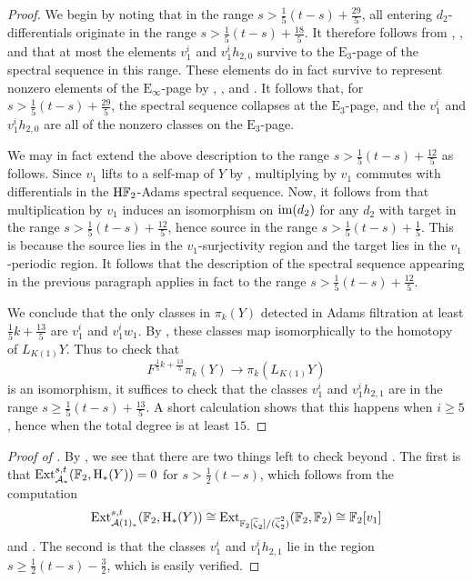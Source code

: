 \begin{proof}
    We begin by noting that in the range $s > \frac{1}{5} (t-s) + \frac{29}{5}$, all entering $d_2$-differentials originate in the range $s > \frac{1}{5} (t-s) + \frac{18}{5}$. It therefore follows from , ,  and  that at most the elements $v_1 ^i$ and $v_1 ^i h_{2,0}$ survive to the $\mathrm{E}_3$-page of the spectral sequence in this range. These elements do in fact survive to represent nonzero elements of the $\mathrm{E}_\infty$-page by , , and . It follows that, for $s > \frac{1}{5} (t-s) + \frac{29}{5}$, the spectral sequence collapses at the $\mathrm{E}_3$-page, and the $v_1 ^i$ and $v_1^i h_{2,0}$ are all of the nonzero classes on the $\mathrm{E}_3$-page.

    We may in fact extend the above description to the range $s > \frac{1}{5} (t-s) + \frac{12}{5}$ as follows. Since $v_1$ lifts to a self-map of $Y$ by , multiplying by $v_1$ commutes with differentials in the $\mathrm{H}\mathbb{F}_2$-Adams spectral sequence. Now, it follows from  that multiplication by $v_1$ induces an isomorphism on $\operatorname{\mathrm{im}}(d_2)$ for any $d_2$ with target in the range $s > \frac{1}{5}(t-s) + \frac{12}{5}$, hence source in the range $s > \frac{1}{5} (t-s) + \frac{1}{5}$. This is because the source lies in the $v_1$-surjectivity region and the target lies in the $v_1$-periodic region. It follows that the description of the spectral sequence appearing in the previous paragraph applies in fact to the range $s > \frac{1}{5} (t-s) + \frac{12}{5}$.

    We conclude that the only classes in $\pi_k (Y)$ detected in Adams filtration at least $\frac{1}{5} k + \frac{13}{5}$ are $v_1 ^i$ and $v_1 ^i w_1$. By , these classes map isomorphically to the homotopy of $L_{K(1)} Y$. Thus to check that \[F^{\frac{1}{5} k + \frac{13}{5}} \pi_k (Y) \to \pi_k (L_{K(1)} Y)\] is an isomorphism, it suffices to check that the classes $v_1 ^i$ and $v_1 ^i h_{2,1}$ are in the range $s \geq \frac{1}{5}(t-s) + \frac{13}{5}$. A short calculation shows that this happens when $i \geq 5$, hence when the total degree is at least $15$.
\end{proof}

\begin{proof}[Proof of ]
    By , we see that there are two things left to check beyond . The first is that $\operatorname{\mathrm{Ext}}_{\operatorname{\mathcal{A}}_{*}} ^{s,t} (\operatorname{\mathbb{F}}_2, \mathrm{H}_* (Y)) = 0$ for $s > \frac{1}{2} (t-s)$, which follows from the computation \[\operatorname{\mathrm{Ext}}_{\operatorname{\mathcal{A}}(1)_*} ^{s,t} (\operatorname{\mathbb{F}}_2, \mathrm{H}_*(Y)) \cong \operatorname{\mathrm{Ext}}_{\operatorname{\mathbb{F}}_2 [\overline{\zeta}_2]/(\overline{\zeta}_2 ^2)} (\operatorname{\mathbb{F}}_2, \operatorname{\mathbb{F}}_2) \cong \operatorname{\mathbb{F}}_2 [v_1]\] and \cite[Proposition 3.2]{Miller-Wilkerson}. The second is that the classes $v_1 ^i$ and $v_1^i h_{2,1}$ lie in the region $s \geq \frac{1}{2} (t-s) - \frac{3}{2}$, which is easily verified.
\end{proof}

